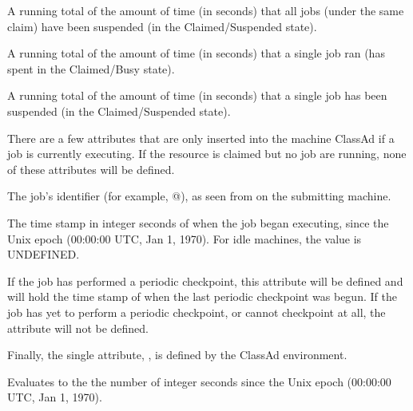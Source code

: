 \begin{description}
\item[\AdAttr{TotalClaimSuspendTime}:] A running total of the amount of
time (in seconds) that all jobs (under the same claim) have been
suspended (in the Claimed/Suspended state).

\item[\AdAttr{TotalJobRunTime}:] A running total of the amount of
time (in seconds) that a single job ran
(has spent in the Claimed/Busy state).

\item[\AdAttr{TotalJobSuspendTime}:] A running total of the amount of
time (in seconds) that a single job has been suspended
(in the Claimed/Suspended state).

\end{description}

There are a few attributes that are only inserted into the
machine ClassAd if a job is currently executing.  
If the resource is claimed but no job are running, none of these
attributes will be defined.

\begin{description}

\item[\AdAttr{JobId}:] The job's identifier (for example,
@), as seen from 
on the submitting machine.

\item[\AdAttr{JobStart}:] The time stamp in integer seconds of when the job began
executing, since the Unix epoch (00:00:00 UTC, Jan 1, 1970).  For idle
machines, the value is UNDEFINED.

\item[\AdAttr{LastPeriodicCheckpoint}:] If the job has performed a
periodic checkpoint, this attribute will be defined and will hold the
time stamp of when the last periodic checkpoint was begun.
If the job has yet to perform a periodic checkpoint, or cannot
checkpoint at all, the  attribute will
not be defined.

\end{description}

Finally, the single attribute, 
, is defined by the ClassAd
environment.
\begin{description}
\item[\AdAttr{CurrentTime}:] Evaluates to the 
the number of integer seconds since the Unix epoch (00:00:00 UTC, Jan 1, 1970).
\end{description}

